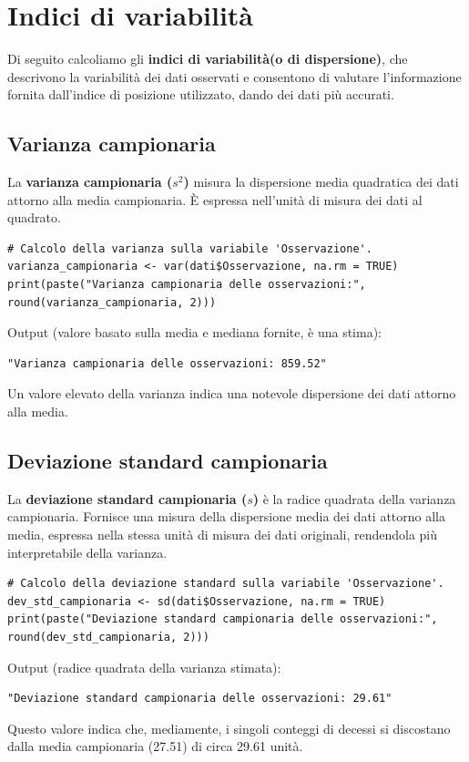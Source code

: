 \documentclass[14pt, openany, titlepage]{report} %
\begin{document}
\chapter{Indici di variabilità} 
Di seguito calcoliamo gli \textbf{indici di variabilità(o di dispersione)}, che descrivono la 
variabilità dei dati osservati e consentono di valutare l'informazione 
fornita dall'indice di posizione utilizzato, dando dei dati più accurati.

\section{Varianza campionaria}
La \textbf{varianza campionaria ($s^2$)} misura la dispersione
media quadratica dei dati attorno alla media campionaria.
È espressa nell'unità di misura dei dati al quadrato.
\begin{center}
\begin{lstlisting}[breaklines=true]
# Calcolo della varianza sulla variabile 'Osservazione'.
varianza_campionaria <- var(dati$Osservazione, na.rm = TRUE)
print(paste("Varianza campionaria delle osservazioni:", round(varianza_campionaria, 2)))
\end{lstlisting}
\end{center}
\noindent
Output (valore basato sulla media e mediana fornite, è una stima):
\begin{verbatim}
"Varianza campionaria delle osservazioni: 859.52" 
\end{verbatim}
Un valore elevato della varianza indica una notevole
 dispersione dei dati attorno alla media.
    
\section{Deviazione standard campionaria}
La \textbf{deviazione standard campionaria ($s$)} è la radice quadrata 
della varianza campionaria. Fornisce una misura della dispersione
 media dei dati attorno alla media, espressa nella stessa unità 
 di misura dei dati originali, rendendola più interpretabile 
 della varianza.
\begin{center}
\begin{lstlisting}[breaklines=true]
# Calcolo della deviazione standard sulla variabile 'Osservazione'.
dev_std_campionaria <- sd(dati$Osservazione, na.rm = TRUE)
print(paste("Deviazione standard campionaria delle osservazioni:", round(dev_std_campionaria, 2)))
\end{lstlisting}
\end{center}
\noindent
Output (radice quadrata della varianza stimata):
\begin{verbatim}
"Deviazione standard campionaria delle osservazioni: 29.61"
\end{verbatim}
Questo valore indica che, mediamente, i singoli conteggi di 
decessi si discostano dalla media campionaria (27.51) di 
circa 29.61 unità.
    
\end{document}
